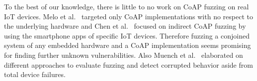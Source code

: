 
To the best of our knowledge, there is little to no work on CoAP fuzzing on real IoT devices. Melo et al.~\cite{Melo2017RobustnessTO} targeted only CoAP implementations with no respect to the underlying hardware and Chen et al.~\cite{chen2018ndss} focused on indirect CoAP fuzzing by using the smartphone apps of specific IoT devices. Therefore fuzzing a conjoined system of any embedded hardware and a CoAP implementation seems promising for finding further unknown vulnerabilities. Also Muench et al.~\cite{EURECOM+5417} elaborated on different approaches to evaluate fuzzing and detect corrupted behavior aside from total device failures.
